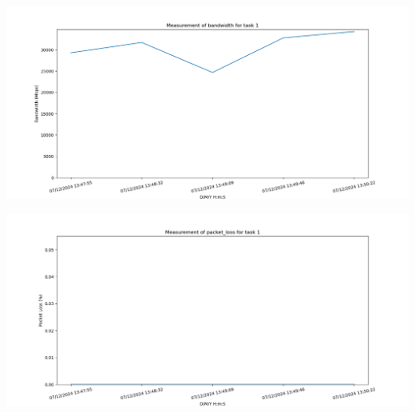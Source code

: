 \documentclass[a4paper,12pt]{scrreprt}
\begin{document}
\begin{minipage}{.5\textwidth}
    \centering
    \includegraphics[width=\textwidth]{img/analysis/bandwidth.png}
    \label{fig:bandwidth}
\end{minipage}
\hfill
\begin{minipage}{.5\textwidth}
    \centering
    \includegraphics[width=\textwidth]{img/analysis/packet_loss.png}
    \label{fig:packet_loss}
\end{minipage}
\end{document}
